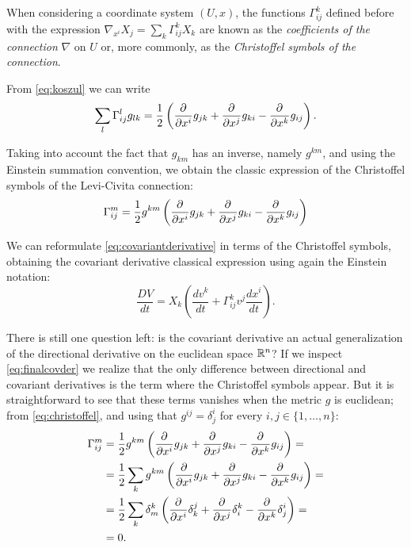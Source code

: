 \begin{remark}
	When considering a coordinate system $(U,x)$, the functions $\Gamma^k_{ij}$ defined before with the expression $\nabla_{x^i}X_j = \sum_k \Gamma^k_{ij} X_k$ are known as the \emph{coefficients of the connection} $\nabla$ on $U$ or, more commonly, as the \emph{Christoffel symbols of the connection}.
	
	From \autoref{eq:koszul} we can write
	\[
		\sum_l \Gamma^l_{ij}g_{lk} = \frac{1}{2} \left( \frac{\partial^{} }{\partial x^i} g_{jk} + \frac{\partial^{} }{\partial x^j} g_{ki} - \frac{\partial^{} }{\partial x^k}g_{ij} \right).
	\]
	
	Taking into account the fact that $g_{km}$ has an inverse, namely $g^{km}$, and using the Einstein summation convention, we obtain the classic expression of the Christoffel symbols of the Levi-Civita connection:
	\begin{equation}
		\label{eq:christoffel}
		\Gamma^m_{ij} = \frac{1}{2} g^{km} \left( \frac{\partial^{} }{\partial x^i} g_{jk} + \frac{\partial^{} }{\partial x^j} g_{ki} - \frac{\partial^{} }{\partial x^k}g_{ij} \right)
	\end{equation}
	
	We can reformulate \autoref{eq:covariantderivative} in terms of the Christoffel symbols, obtaining the covariant derivative classical expression using again the Einstein notation:
	\begin{equation}
		\label{eq:finalcovder}
		\frac{DV}{dt} = X_k \left( \frac{dv^k}{dt} + \Gamma^k_{ij} v^j \frac{d x^i}{dt} \right).
	\end{equation}
\end{remark}

There is still one question left: is the covariant derivative an actual generalization of the directional derivative on the euclidean space $\mathbb{R}^n$? If we inspect \autoref{eq:finalcovder} we realize that the only difference between directional and covariant derivatives is the term where the Christoffel symbols appear. But it is straightforward to see that these terms vanishes when the metric $g$ is euclidean; from \autoref{eq:christoffel}, and using that $g^{ij} = \delta^i_j$ for every $i,j \in \{1, \dots, n\}$:
\begin{align*}
	\Gamma^m_{ij} &= \frac{1}{2} g^{km} \left( \frac{\partial^{} }{\partial x^i} g_{jk} + \frac{\partial^{} }{\partial x^j} g_{ki} - \frac{\partial^{} }{\partial x^k}g_{ij} \right) = \\
	&= \frac{1}{2} \sum_k g^{km} \left( \frac{\partial^{} }{\partial x^i} g_{jk} + \frac{\partial^{} }{\partial x^j} g_{ki} - \frac{\partial^{} }{\partial x^k}g_{ij} \right) = \\
	&= \frac{1}{2} \sum_k \delta^k_m \left( \frac{\partial^{} }{\partial x^i} \delta^j_k + \frac{\partial^{} }{\partial x^j} \delta^k_i - \frac{\partial^{} }{\partial x^k} \delta^i_j \right) = \\
	&= 0.
\end{align*}

